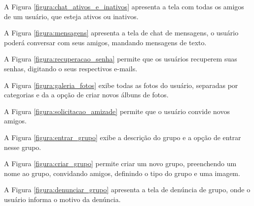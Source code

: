 
A Figura \ref{figura:chat_ativos_e_inativos} apresenta a tela com todas os amigos de um usuário, que esteja ativos ou inativos.


A Figura \ref{figura:mensagens} apresenta a tela de chat de mensagens, o usuário poderá conversar com seus amigos, mandando mensagens de texto.


A Figura \ref{figura:recuperacao_senha} permite que os usuários recuperem suas senhas, digitando o seus respectivos e-mails.


A Figura \ref{figura:galeria_fotos} exibe todas as fotos do usuário, separadas por categorias  e da a opção de criar novos álbuns de fotos.


A Figura \ref{figura:solicitacao_amizade} permite que o usuário convide novos amigos.


A Figura \ref{figura:entrar_grupo} exibe a descrição do grupo e a opção de entrar nesse grupo.


A Figura \ref{figura:criar_grupo} permite criar um novo grupo, preenchendo um nome ao grupo, convidando amigos, definindo o tipo do grupo e uma imagem.


A Figura \ref{figura:denunciar_grupo} apresenta a tela de denúncia de grupo, onde o usuário informa o motivo da denúncia.


